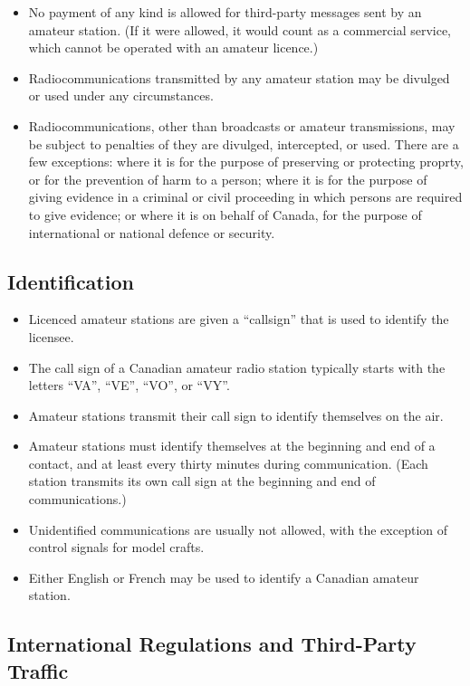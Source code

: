 \documentclass[letterpaper,12pt]{scrartcl}
\begin{document}
\begin{itemize}
\item No payment of any kind is allowed for third-party messages sent by an amateur station.
(If it were allowed, it would count as a commercial service, which cannot be operated with an amateur licence.)
\item Radiocommunications transmitted by any amateur station may be divulged or used under any circumstances.
\item Radiocommunications, other than broadcasts or amateur transmissions, may be subject to penalties of they are divulged, intercepted, or used.
There are a few exceptions: where it is for the purpose of preserving or protecting proprty, or for the prevention of harm to a person;
where it is for the purpose of giving evidence in a criminal or civil proceeding in which persons are required to give evidence;
or where it is on behalf of Canada, for the purpose of international or national defence or security.
\end{itemize}

\subsection{Identification}

\begin{itemize}
\item Licenced amateur stations are given a ``callsign'' that is used to identify the licensee.
\item The call sign of a Canadian amateur radio station typically starts with the letters ``VA'', ``VE'', ``VO'', or ``VY''.
\item Amateur stations transmit their call sign to identify themselves on the air.
\item Amateur stations must identify themselves at the beginning and end of a contact, and at least every thirty minutes during communication.
(Each station transmits its own call sign at the beginning and end of communications.)
\item Unidentified communications are usually not allowed, with the exception of control signals for model crafts.
\item Either English or French may be used to identify a Canadian amateur station.
\end{itemize}

\subsection{International Regulations and Third-Party Traffic}
\end{document}
